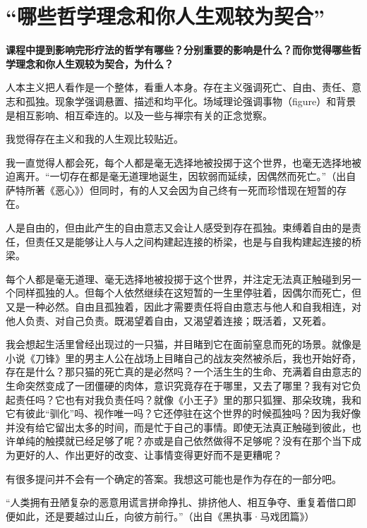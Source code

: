 \chapter{“哪些哲学理念和你人生观较为契合”}







\textbf{课程中提到影响完形疗法的哲学有哪些？分别重要的影响是什么？而你觉得哪些哲学理念和你人生观较为契合，为什么？}

人本主义把人看作是一个整体，看重人本身。存在主义强调死亡、自由、责任、意志和孤独。现象学强调悬置、描述和均平化。场域理论强调事物（figure）和背景是相互影响、相互牵连的。以及一些与禅宗有关的正念觉察。

我觉得存在主义和我的人生观比较贴近。

我一直觉得人都会死，每个人都是毫无选择地被投掷于这个世界，也毫无选择地被迫离开。“一切存在都是毫无道理地诞生，因软弱而延续，因偶然而死亡。”（出自萨特所著《恶心》）但同时，有的人又会因为自己终有一死而珍惜现在短暂的存在。

人是自由的，但由此产生的自由意志又会让人感受到存在孤独。束缚着自由的是责任，但责任又是能够让人与人之间构建起连接的桥梁，也是与自我构建起连接的桥梁。

每个人都是毫无道理、毫无选择地被投掷于这个世界，并注定无法真正触碰到另一个同样孤独的人。但每个人依然继续在这短暂的一生里停驻着，因偶尔而死亡，但又是一种必然。自由且孤独着，因此才需要责任将自由意志与他人和自我相连，对他人负责、对自己负责。既渴望着自由，又渴望着连接；既活着，又死着。

我会想起生活里曾经出现过的一只猫，并目睹到它在面前窒息而死的场景。就像是小说《刀锋》里的男主人公在战场上目睹自己的战友突然被杀后，我也开始好奇，存在是什么？那只猫的死亡真的是必然吗？一个活生生的生命、充满着自由意志的生命突然变成了一团僵硬的肉体，意识究竟存在于哪里，又去了哪里？我有对它负起责任吗？它也有对我负责任吗？就像《小王子》里的那只狐狸、那朵玫瑰，我和它有彼此“驯化”吗、视作唯一吗？它还停驻在这个世界的时候孤独吗？因为我好像并没有给它留出太多的时间，而是忙于自己的事情。即使无法真正触碰到彼此，也许单纯的触摸就已经足够了呢？亦或是自己依然做得不足够呢？没有在那个当下成为更好的人、作出更好的改变、让事情变得更好而不是更糟呢？

有很多提问并不会有一个确定的答案。我想这可能也是作为存在的一部分吧。

“人类拥有丑陋复杂的恶意\pozhehao{}用谎言拼命挣扎、排挤他人、相互争夺、重复着借口\pozhehao{}即便如此，还是要越过山丘，向彼方前行。”（出自《黑执事·马戏团篇》）
